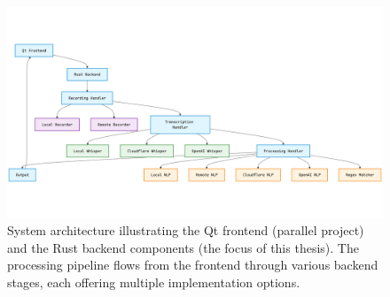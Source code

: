 \begin{figure}[H]
    \centering
    \includegraphics[width=\textwidth]{assets/stackchart}
    \caption{System architecture illustrating the Qt frontend (parallel project)
    and the Rust backend components (the focus of this thesis).
    The processing pipeline flows from the frontend through various backend stages,
    each offering multiple implementation options.}
    \label{fig:design}
\end{figure}
